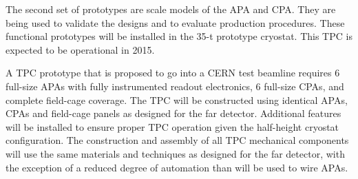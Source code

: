 The second set of prototypes are scale models of the APA and CPA. They
are being used to validate the designs and to evaluate production
procedures. These functional prototypes will be installed in the 35-t
prototype cryostat. This TPC is expected to be operational in 2015.

A TPC prototype that is proposed to go into a CERN test beamline
requires 6 full-size APAs with fully instrumented readout electronics,
6 full-size CPAs, and complete field-cage coverage. The TPC will be
constructed using identical APAs, CPAs and field-cage panels as
designed for the far detector. Additional features will be installed
to ensure proper TPC operation given the half-height cryostat
configuration. The construction and assembly of all TPC mechanical
components will use the same materials and techniques as designed for
the far detector, with the exception of a reduced degree of automation
than will be used to wire APAs.

